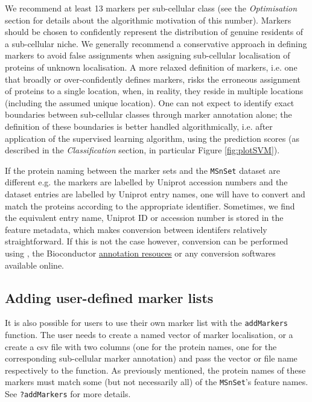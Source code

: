 We recommend at least 13 markers per sub-cellular class (see the
\textit{Optimisation} section for details about the algorithmic
motivation of this number). Markers should be chosen to confidently
represent the distribution of genuine residents of a sub-cellular
niche. We generally recommend a conservative approach in defining
markers to avoid false assignments when assigning sub-cellular
localisation of proteins of unknown localisation. A more relaxed
definition of markers, i.e. one that broadly or over-confidently
defines markers, risks the erroneous assignment of proteins to a
single location, when, in reality, they reside in multiple locations
(including the assumed unique location). One can not expect to
identify exact boundaries between sub-cellular classes through marker
annotation alone; the definition of these boundaries is better handled
algorithmically, i.e. after application of the supervised learning
algorithm, using the prediction scores (as described in the
\textit{Classification} section, in particular Figure
\ref{fig:plotSVM}).

If the protein naming between the marker sets and the \texttt{MSnSet}
dataset are different e.g. the markers are labelled by Uniprot
accession numbers and the dataset entries are labelled by Uniprot
entry names, one will have to convert and match the proteins according
to the appropriate identifier. Sometimes, we find the equivalent entry
name, Uniprot ID or accession number is stored in the feature
metadata, which makes conversion between identifers relatively
straightforward. If this is not the case however, conversion can be
performed using , the Bioconductor
\href{http://bioconductor.org/help/workflows/annotation/Annotation_Resources/}{annotation
  resouces} or any conversion softwares available online.

\subsection*{Adding user-defined marker lists}
It is also possible for users to use their own marker list with the
\texttt{addMarkers} function. The user needs to create a named vector
of marker localisation, or a create a csv file with two columns (one
for the protein names, one for the corresponding sub-cellular marker
annotation) and pass the vector or file name respectively to the
function. As previously mentioned, the protein names of these markers
must match some (but not necessarily all) of the \texttt{MSnSet}'s
feature names. See \texttt{?addMarkers} for more details.

